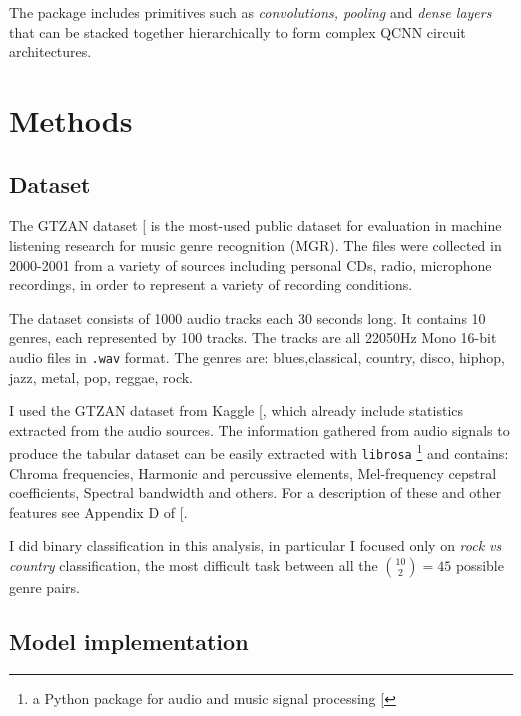 \documentclass[
  13pt,
  a4paper,
  DIV=11,
  numbers=noendperiod,
  oneside]{scrreprt}
\begin{document}
The package includes primitives such as \emph{convolutions, pooling} and
\emph{dense layers} that can be stacked together hierarchically to form
complex QCNN circuit architectures.


\chapter{Methods}\label{methods}

\section{Dataset}\label{dataset}

The GTZAN dataset
{[}\citeproc{ref-gtzan_tzanetakis_essl_cook_2001}{7}{]} is the most-used
public dataset for evaluation in machine listening research for music
genre recognition (MGR). The files were collected in 2000-2001 from a
variety of sources including personal CDs, radio, microphone recordings,
in order to represent a variety of recording conditions.

The dataset consists of 1000 audio tracks each 30 seconds long. It
contains 10 genres, each represented by 100 tracks. The tracks are all
22050Hz Mono 16-bit audio files in \texttt{.wav} format. The genres are:
blues,classical, country, disco, hiphop, jazz, metal, pop, reggae, rock.

I used the GTZAN dataset from Kaggle
{[}\citeproc{ref-GTZAN_kaggle}{8}{]}, which already include statistics
extracted from the audio sources. The information gathered from audio
signals to produce the tabular dataset can be easily extracted with
\texttt{librosa} \footnote{a Python package for audio and music signal
  processing {[}\citeproc{ref-mcfee2015librosa}{9}{]}} and contains:
Chroma frequencies, Harmonic and percussive elements, Mel-frequency
cepstral coefficients, Spectral bandwidth and others. For a description
of these and other features see Appendix D of
{[}\citeproc{ref-lourens2023hierarchical}{1}{]}.

I did binary classification in this analysis, in particular I focused
only on \emph{rock vs country} classification, the most difficult task
between all the \(\binom{10}{2} = 45\) possible genre pairs.

\section{Model implementation}\label{model-implementation}
\end{document}
